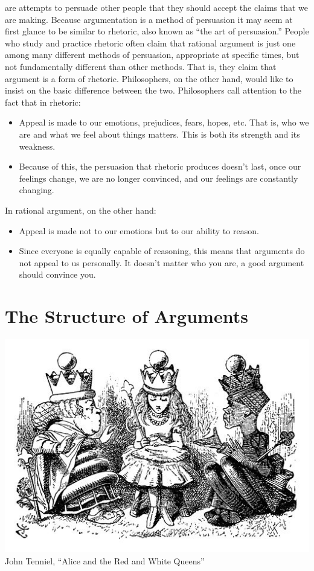 \documentclass[justified]{tufte-book}
\begin{document}
 are attempts to persuade other people that they should accept the claims that we are making. Because argumentation is a method of persuasion it may seem at first glance to be similar to rhetoric, also known as ``the art of persuasion.'' People who study and practice rhetoric often claim that rational argument is just one among many different methods of persuasion, appropriate at specific times, but not fundamentally different than other methods. That is, they claim that argument is a form of rhetoric. Philosophers, on the other hand, would like to insist on the basic difference between the two. Philosophers call attention to the fact that in rhetoric:

\begin{itemize}
\item
  Appeal is made to our emotions, prejudices, fears, hopes, etc. That is, who we are and what we feel about things matters. This is both its strength and its weakness.
\item
  Because of this, the persuasion that rhetoric produces doesn't last, once our feelings change, we are no longer convinced, and our feelings are constantly changing.
\end{itemize}

In rational argument, on the other hand:

\begin{itemize}
\item
  Appeal is made not to our emotions but to our ability to reason.
\item
  Since everyone is equally capable of reasoning, this means that arguments do not appeal to us personally. It doesn't matter who you are, a good argument should convince you.
\end{itemize}

\hypertarget{the-structure-of-arguments}{%
\section{The Structure of Arguments}\label{the-structure-of-arguments}}

\begin{marginfigure}
\includegraphics{img/tenniel-alice-queens.jpg} John Tenniel, ``Alice and
the Red and White Queens''
\end{marginfigure}
\end{document}
